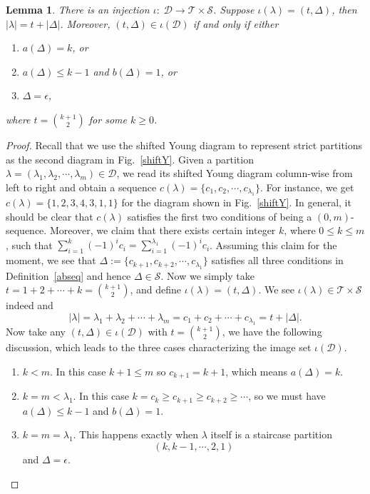 \documentclass[12pt,reqno]{amsart}
\numberwithin{equation}{section}
\theoremstyle{plain}
\newtheorem{lemma}[theorem]{Lemma}
\theoremstyle{definition}
\newcommand{\s}{\mathcal{S}}
\newcommand{\T}{\mathcal{T}}
\newcommand{\D}{\mathcal{D}}
\begin{document}
\begin{lemma}\label{decomp}
There is an injection $\iota:\; \D\rightarrow \T\times \s$. Suppose $\iota(\lambda)=(t,\Delta)$, then $|\lambda|=t+|\Delta|$. Moreover, $(t,\Delta)\in \iota(\D)$ if and only if either
\begin{enumerate}
\item $a(\Delta)=k$, or
\item $a(\Delta)\le k-1$ and $b(\Delta)=1$, or
\item $\Delta=\epsilon$,
\end{enumerate}
where $t=\binom{k+1}{2}$ for some $k\ge 0$.
\end{lemma}
\begin{proof}
Recall that we use the shifted Young diagram to represent strict partitions as the second diagram in Fig.~\ref{shiftY}. Given a partition $\lambda=(\lambda_1,\lambda_2,\cdots,\lambda_m)\in \D$, we read its shifted Young diagram column-wise from left to right and obtain a sequence $c(\lambda)=\{c_1,c_2,\cdots,c_{\lambda_1}\}$. For instance, we get $c(\lambda)=\{1,2,3,4,3,1,1\}$ for the diagram shown in Fig.~\ref{shiftY}. In general, it should be clear that $c(\lambda)$ satisfies the first two conditions of being a $(0,m)$-sequence. Moreover, we claim that there exists certain integer $k$, where $0\le k \le m$, such that $\sum_{i=1}^{k}(-1)^{i}c_i=\sum_{i=1}^{\lambda_1}(-1)^{i}c_i$. Assuming this claim for the moment, we see that $\Delta:=\{c_{k+1},c_{k+2},\cdots,c_{\lambda_1}\}$ satisfies all three conditions in Definition~\ref{abseq} and hence $\Delta\in\s$. Now we simply take $t=1+2+\cdots+k=\binom{k+1}{2}$, and define $\iota(\lambda)=(t,\Delta)$. We see $\iota(\lambda)\in \T\times \s$ indeed and
$$|\lambda|=\lambda_1+\lambda_2+\cdots+\lambda_m=c_1+c_2+\cdots+c_{\lambda_1}=t+|\Delta|.$$
Now take any $(t,\Delta)\in\iota(\D)$ with $t=\binom{k+1}{2}$, we have the following discussion, which leads to the three cases characterizing the image set $\iota(\D)$.
\begin{enumerate}
\item $k<m$. In this case $k+1\le m$ so $c_{k+1}=k+1$, which means $a(\Delta)=k$.
\item $k=m<\lambda_1$. In this case $k=c_k\ge c_{k+1}\ge c_{k+2}\geq\cdots$, so we must have $a(\Delta)\le k-1$ and $b(\Delta)=1$.
\item $k=m=\lambda_1$. This happens exactly when $\lambda$ itself is a staircase partition $$(k,k-1,\cdots,2,1)$$ and $\Delta=\epsilon$.
\end{enumerate}


\end{proof}
\end{document}
